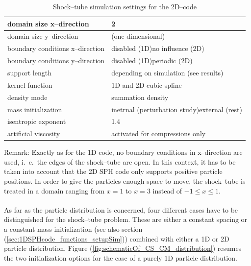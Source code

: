 \documentclass{report}
\begin{document}
\begin{table}[h] %
\label{tab:SimuSettings_Shock}
\centering

\begin{tabular}[c]{|l|p{5cm}|} %
\hline
\hline
domain size x--direction &  2\\
\hline
domain size y--direction &  (one dimensional)\\
\hline
boundary conditions x--direction & disabled (1D)\newline no influence (2D)\\
\hline
boundary conditions y--direction & disabled (1D)\newline periodic (2D)\\
\hline
support length & depending on simulation \newline (see results)  \\
\hline
kernel function & 1D and 2D cubic spline \\
\hline
density mode & summation density \\
\hline
mass initialization & inetrnal (perturbation study)\newline external (rest)\\
\hline
isentropic exponent & 1.4\\
\hline
artificial viscosity& activated for compressions only\\ 
\hline
\hline
\end{tabular}
\caption[]{Shock--tube simulation settings for the 2D--code}

\end{table}
Remark: Exactly as for the 1D code, no boundary conditions in x--direction are used, i.\ e.\ the edges of the shock--tube are open. In this context, it has to be taken into account that the 2D SPH code only supports positive particle positions. In order to give the particles enough space to move, the shock--tube is treated in a domain ranging from $x=1$ to $x=3$ instead of $-1\leq x\leq1$. \\
\\
\indent
As far as the particle distribution is concerned, four different cases have to be distinguished for the shock--tube problem. These are either a constant spacing or a constant mass initialization (see also section (\ref{sec:1DSPHcode_functions_setupSim})) combined with either a 1D or 2D particle distribution.
Figure (\ref{fig:schematicOf_CS_CM_distribution}) resumes the two initialization options for the case of a purely 1D particle distribution.
\end{document}
